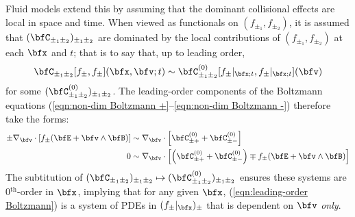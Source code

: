     
    \line

    Fluid models extend this by assuming that the dominant collisional effects are local in space and time.  When viewed as functionals on $(f_{\pm_{1}}, f_{\pm_{2}})$, it is assumed that $(\bfC_{\pm_{1}\pm_{2}})_{\pm_{1}\pm_{2}}$ are dominated by the local contributions of $(f_{\pm_{1}}, f_{\pm_{2}})$ at each $\bfx$ and $t$;  that is to say that, up to leading order,
    \begin{equation}
        \bfC_{\pm_{1}\pm_{2}}[f_{\pm}, f_{\pm}](\bfx, \bfv; t)  \sim  \bfC_{\pm_{1}\pm_{2}}^{(0)}[f_{\pm}|_{\bfx; t}, f_{\pm}|_{\bfx; t}](\bfv)
    \end{equation}
    for some $(\bfC_{\pm_{1}\pm_{2}}^{(0)})_{\pm_{1}\pm_{2}}$. The leading-order components of the Boltzmann equations (\ref{eqn:non-dim Boltzmann +}–\ref{eqn:non-dim Boltzmann -}) therefore take the forms:
    \begin{align}
        \pm \nabla_{\bfv}\cdot[f_{\pm}(\bfE + \bfv\wedge\bfB)]  &\sim  \nabla_{\bfv}\cdot\left[\bfC_{\pm+}^{(0)} + \bfC_{\pm-}^{(0)}\right]  \\
        0  &\sim  \nabla_{\bfv}\cdot\left[\left(\bfC_{\pm+}^{(0)} + \bfC_{\pm-}^{(0)}\right) \mp f_{\pm}(\bfE + \bfv\wedge\bfB)\right]  \label{eqn:leading-order Boltzmann}
    \end{align}
    The subtitution of $(\bfC_{\pm_{1}\pm_{2}})_{\pm_{1}\pm_{2}}  \mapsto  (\bfC_{\pm_{1}\pm_{2}}^{(0)})_{\pm_{1}\pm_{2}}$ ensures these systems are 0$^{\text{th}}$-order in $\bfx$, implying that for any given $\bfx$, (\ref{eqn:leading-order Boltzmann}) is a system of PDEs in $(f_{\pm}|_{\bfx})_{\pm}$ that is dependent on $\bfv$ \emph{only}.

    \line

